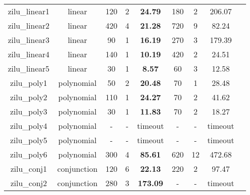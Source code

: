 \begin{table}[t]
\begin{tabular}{l c | c c c | c c c | c }
\multicolumn{1}{|c|}{zilu\_linear1}         			&linear 		&120 &2 &\textbf{24.79}  		&180 &2   &206.07  			&\multicolumn{1}{|c|}{\xmark} \\
\multicolumn{1}{|c|}{zilu\_linear2}         			&linear 		&420 &4 &\textbf{21.28}  		&720  &9  &82.24  			&\multicolumn{1}{|c|}{\cmark} \\
\multicolumn{1}{|c|}{zilu\_linear3}         			&linear 		&90 &1 &\textbf{16.19}  		&270 &3  &179.39  			&\multicolumn{1}{|c|}{\cmark} \\
\multicolumn{1}{|c|}{zilu\_linear4}         			&linear 		&140 &1 &\textbf{10.19}  		&420 &2  &24.51  			&\multicolumn{1}{|c|}{\cmark} \\
\multicolumn{1}{|c|}{zilu\_linear5}         			&linear 		&30 &1 &\textbf{8.57}  			&60 &3   &12.58  			&\multicolumn{1}{|c|}{\cmark} \\

\multicolumn{1}{|c|}{zilu\_poly1}         				&polynomial 	&50 &2 &\textbf{20.48}			&70 &1 &28.48  				&\multicolumn{1}{|c|}{\xmark} \\
\multicolumn{1}{|c|}{zilu\_poly2}         				&polynomial 	&110  &1 &\textbf{24.27}  		&70   &2 &41.62  			&\multicolumn{1}{|c|}{\xmark} \\
\multicolumn{1}{|c|}{zilu\_poly3}         				&polynomial 	&30 &1 &\textbf{11.83}  		&70  &2  &18.27  			&\multicolumn{1}{|c|}{\xmark} \\
\multicolumn{1}{|c|}{zilu\_poly4}         				&polynomial 	&- &-&timeout  				&-  &-  &timeout 			&\multicolumn{1}{|c|}{\xmark} \\
\multicolumn{1}{|c|}{zilu\_poly5}         				&polynomial 	&- &- &timeout  			&-  &-  &timeout  		&\multicolumn{1}{|c|}{\xmark} \\
\multicolumn{1}{|c|}{zilu\_poly6}         				&polynomial 	&300 &4 &\textbf{85.61}  		&620   &12 &472.68  		&\multicolumn{1}{|c|}{\xmark} \\

\multicolumn{1}{|c|}{zilu\_conj1}         				&conjunction 	&120 &6 &\textbf{22.13}  		&220  &2  &97.47  			&\multicolumn{1}{|c|}{\xmark} \\
\multicolumn{1}{|c|}{zilu\_conj2}         				&conjunction 	&280 &3 &\textbf{173.09}  		&-  &-  &timeout  		&\multicolumn{1}{|c|}{\cmark} \\


\end{tabular}
\end{table}
